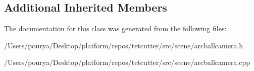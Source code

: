 \subsection*{Additional Inherited Members}


The documentation for this class was generated from the following files\+:\begin{DoxyCompactItemize}
\item 
/\+Users/pourya/\+Desktop/platform/repos/tetcutter/src/scene/arcballcamera.\+h\item 
/\+Users/pourya/\+Desktop/platform/repos/tetcutter/src/scene/arcballcamera.\+cpp\end{DoxyCompactItemize}
